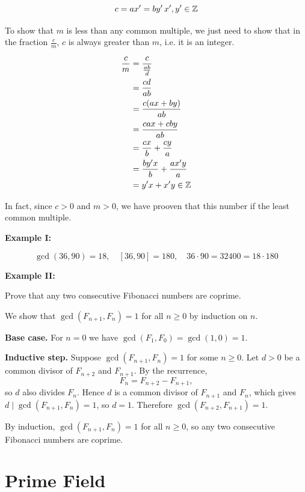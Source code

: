 \[
	c = ax' = by' \, x',y' \in \mathbb{Z}
\]

To show that \(m\) is less than any common multiple, we just need to show that in the fraction \(\frac{c}{m}\), \(c\) is always greater than \(m\), i.e.
it is an integer.

\begin{align*}
	\frac{c}{m} & = \frac{c}{\frac{ab}{d}}           \\
	            & = \frac{cd}{ab}                    \\
	            & = \frac{c(ax + by)}{ab}            \\
	            & = \frac{cax + cby}{ab}             \\
	            & = \frac{cx}{b}  + \frac{cy}{a}     \\
	            & = \frac{by'x}{b}  + \frac{ax'y}{a} \\
	            & = y'x  + x'y \in \mathbb{Z}
\end{align*}

In fact, since \(c > 0\) and \(m > 0\), we have prooven that this number if the least common multiple.

\QED

\textbf{Example I:}

\[
	\gcd(36, 90) = 18, \quad [36, 90] = 180, \quad 36 \cdot 90 = 32400 = 18 \cdot 180
\]

\textbf{Example II:}

Prove that any two consecutive Fibonacci numbers are coprime.

We show that \(\gcd(F_{n+1}, F_n) = 1\) for all \(n \ge 0\) by induction on \(n\).

\textbf{Base case.} For \(n = 0\) we have \(\gcd(F_1, F_0) = \gcd(1, 0) = 1\).

\textbf{Inductive step.} Suppose \(\gcd(F_{n+1}, F_n) = 1\) for some \(n \ge 0\). Let \(d > 0\) be a
common divisor of \(F_{n+2}\) and \(F_{n+1}\). By the recurrence,
\[
	F_n = F_{n+2} - F_{n+1},
\]
so \(d\) also divides \(F_n\). Hence \(d\) is a common divisor of \(F_{n+1}\) and \(F_n\), which gives
\(d \mid \gcd(F_{n+1}, F_n) = 1\), so \(d = 1\). Therefore \(\gcd(F_{n+2}, F_{n+1}) = 1\).

By induction, \(\gcd(F_{n+1}, F_n) = 1\) for all \(n \ge 0\), so any two consecutive Fibonacci
numbers are coprime.

\QED

\section{Prime Field}

